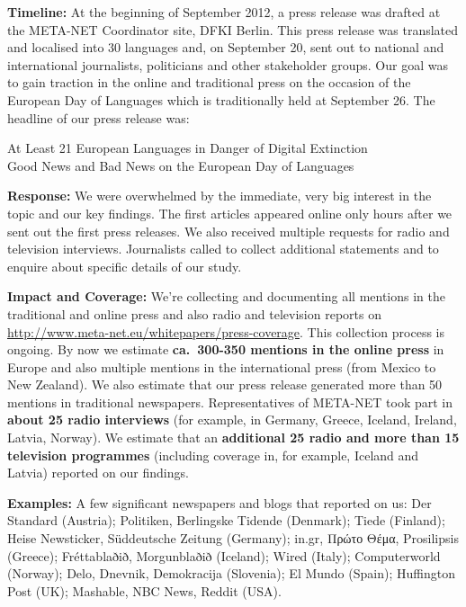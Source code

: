\documentclass[10pt, plain]{../../metanetpaper}
\begin{document}
\smallskip
\textbf{Timeline:} At the beginning of September 2012, a press release was drafted at the META-NET Coordinator site, DFKI Berlin. This press release was translated and localised into 30 languages and, on September 20, sent out to national and international journalists, politicians and other stakeholder groups. Our goal was to gain traction in the online and traditional press on the occasion of the European Day of Languages which is traditionally held at September 26. The headline of our press release was:

\begin{center}
At Least 21 European Languages in Danger of Digital Extinction\\
Good News and Bad News on the European Day of Languages
\end{center}

\textbf{Response:} We were overwhelmed by the immediate, very big interest in the topic and our key findings. The first articles appeared online only hours after we sent out the first press releases. We also received multiple requests for radio and television interviews. Journalists called to collect additional statements and to enquire about specific details of our study. 

\smallskip
\textbf{Impact and Coverage:} We’re collecting and documenting all mentions in the traditional and online press and also radio and television reports on \url{http://www.meta-net.eu/whitepapers/press-coverage}. This collection process is ongoing. By now we estimate \textbf{ca.~300-350 mentions in the online press} in Europe and also multiple mentions in the international press (from Mexico to New Zealand). We also estimate that our press release generated more than 50 mentions in traditional newspapers. Representatives of META-NET took part in \textbf{about 25 radio interviews} (for example, in Germany, Greece, Iceland, Ireland, Latvia, Norway). We estimate that an \textbf{additional 25 radio and more than 15 television programmes} (including coverage in, for example, Iceland and Latvia) reported on our findings. 

\smallskip
\textbf{Examples:} A few significant newspapers and blogs that reported on us: Der Standard (Austria); Politiken, Berlingske Tidende (Denmark); Tiede (Finland); Heise Newsticker, Süddeutsche Zeitung (Germany); in.gr, Πρώτο Θέμα, Pro\-silip\-sis (Greece); Fréttablaðið, Morgunblaðið (Iceland); Wired (Italy); Computerworld (Norway); Delo, Dnevnik, De\-mo\-kra\-cija (Slovenia); El Mundo (Spain); Huffington Post (UK); Mashable, NBC News, Reddit (USA).
\end{document}
